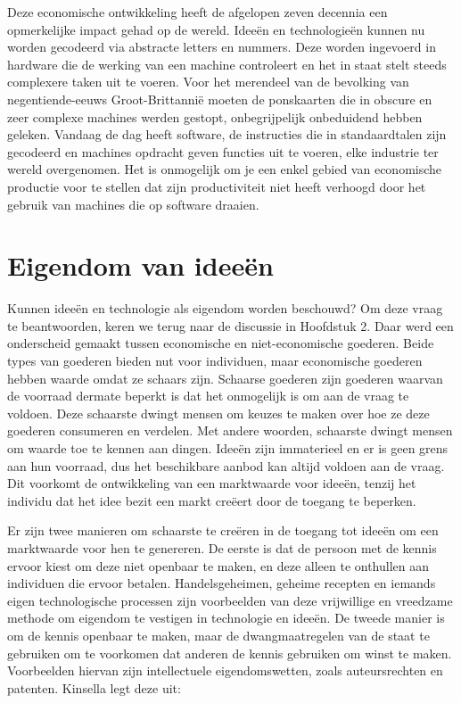 \documentclass[
  a5paper,
  smalldemyvopaper,11pt,twoside,onecolumn,openright,extrafontsizes,
hidelinks]{memoir}
\begin{document}
Deze economische ontwikkeling heeft de afgelopen zeven decennia een
opmerkelijke impact gehad op de wereld. Ideeën en technologieën kunnen
nu worden gecodeerd via abstracte letters en nummers. Deze worden
ingevoerd in hardware die de werking van een machine controleert en het
in staat stelt steeds complexere taken uit te voeren. Voor het merendeel
van de bevolking van negentiende-eeuws Groot-Brittannië moeten de
ponskaarten die in obscure en zeer complexe machines werden gestopt,
onbegrijpelijk onbeduidend hebben geleken. Vandaag de dag heeft
software, de instructies die in standaardtalen zijn gecodeerd en
machines opdracht geven functies uit te voeren, elke industrie ter
wereld overgenomen. Het is onmogelijk om je een enkel gebied van
economische productie voor te stellen dat zijn productiviteit niet heeft
verhoogd door het gebruik van machines die op software draaien.

\section{Eigendom van ideeën}\label{eigendom-van-ideeuxebn}

Kunnen ideeën en technologie als eigendom worden beschouwd? Om deze
vraag te beantwoorden, keren we terug naar de discussie in Hoofdstuk 2.
Daar werd een onderscheid gemaakt tussen economische en niet-economische
goederen. Beide types van goederen bieden nut voor individuen, maar
economische goederen hebben waarde omdat ze schaars zijn. Schaarse
goederen zijn goederen waarvan de voorraad dermate beperkt is dat het
onmogelijk is om aan de vraag te voldoen. Deze schaarste dwingt mensen
om keuzes te maken over hoe ze deze goederen consumeren en verdelen. Met
andere woorden, schaarste dwingt mensen om waarde toe te kennen aan
dingen. Ideeën zijn immaterieel en er is geen grens aan hun voorraad,
dus het beschikbare aanbod kan altijd voldoen aan de vraag. Dit voorkomt
de ontwikkeling van een marktwaarde voor ideeën, tenzij het individu dat
het idee bezit een markt creëert door de toegang te beperken.

Er zijn twee manieren om schaarste te creëren in de toegang tot ideeën
om een marktwaarde voor hen te genereren. De eerste is dat de persoon
met de kennis ervoor kiest om deze niet openbaar te maken, en deze
alleen te onthullen aan individuen die ervoor betalen. Handelsgeheimen,
geheime recepten en iemands eigen technologische processen zijn
voorbeelden van deze vrijwillige en vreedzame methode om eigendom te
vestigen in technologie en ideeën. De tweede manier is om de kennis
openbaar te maken, maar de dwangmaatregelen van de staat te gebruiken om
te voorkomen dat anderen de kennis gebruiken om winst te maken.
Voorbeelden hiervan zijn intellectuele eigendomswetten, zoals
auteursrechten en patenten. Kinsella legt deze uit:
\end{document}

